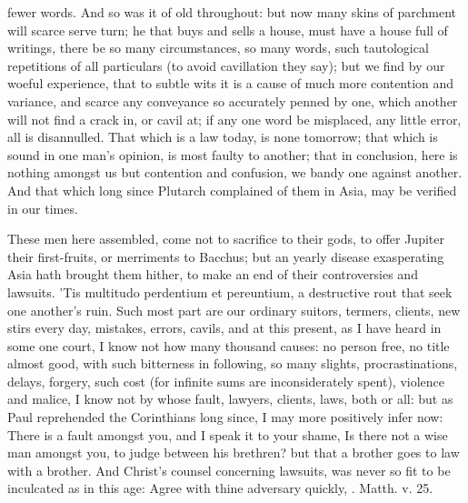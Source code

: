 {fewer words. And so was it of old throughout: but now many skins of
parchment will scarce serve turn; he that buys and sells a house, must
have a house full of writings, there be so many circumstances, so many
words, such tautological repetitions of all particulars (to avoid
cavillation they say); but we find by our woeful experience, that to
subtle wits it is a cause of much more contention and variance, and
scarce any conveyance so accurately penned by one, which another will
not find a crack in, or cavil at; if any one word be misplaced, any
little error, all is disannulled. That which is a law today, is none
tomorrow; that which is sound in one man's opinion, is most faulty to
another; that in conclusion, here is nothing amongst us but contention
and confusion, we bandy one against another. And that which long since
Plutarch complained of them in Asia, may be verified in our times.

These men here assembled, come not to sacrifice to their gods, to offer
Jupiter their first-fruits, or merriments to Bacchus; but an yearly
disease exasperating Asia hath brought them hither, to make an end of
their controversies and lawsuits. 'Tis multitudo perdentium et
pereuntium, a destructive rout that seek one another's ruin. Such most
part are our ordinary suitors, termers, clients, new stirs every day,
mistakes, errors, cavils, and at this present, as I have heard in some
one court, I know not how many thousand causes: no person free, no
title almost good, with such bitterness in following, so many slights,
procrastinations, delays, forgery, such cost (for infinite sums are
inconsiderately spent), violence and malice, I know not by whose fault,
lawyers, clients, laws, both or all: but as Paul reprehended the
Corinthians long since, I may more positively infer now: There is
a fault amongst you, and I speak it to your shame, Is there not a
wise man amongst you, to judge between his brethren? but that a
brother goes to law with a brother. And Christ's counsel
concerning lawsuits, was never so fit to be inculcated as in this age:
Agree with thine adversary quickly, \etc{}. Matth. v. 25.

}
